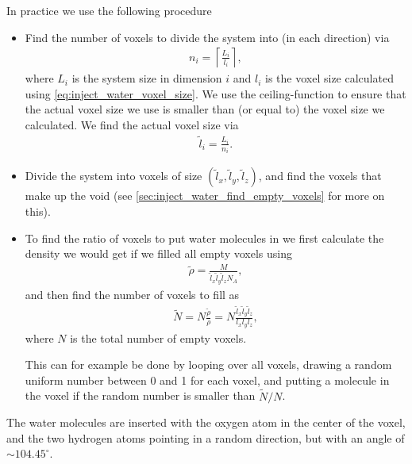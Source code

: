 In practice we use the following procedure
\begin{itemize}
    \item Find the number of voxels to divide the system into (in each direction) via
    \begin{align*}
        n_i = \left\lceil \frac{L_i}{l_i} \right\rceil,
    \end{align*}
    where $L_i$ is the system size in dimension $i$ and $l_i$ is the voxel size calculated using \cref{eq:inject_water_voxel_size}. We use the ceiling-function to ensure that the actual voxel size we use is smaller than (or equal to) the voxel size we calculated. We find the actual voxel size via
    \begin{align*}
        \tilde l_i = \frac{L_i}{n_i}.
    \end{align*}
    \item Divide the system into voxels of size $(\tilde l_x, \tilde l_y, \tilde l_z)$, and find the voxels that make up the void (see \cref{sec:inject_water_find_empty_voxels} for more on this).
    \item To find the ratio of voxels to put water molecules in we first calculate the density we would get if we filled all empty voxels using
    \begin{align*}
        \tilde\rho = \frac{M}{\tilde l_x \tilde l_y \tilde l_z N_A},
    \end{align*}
    and then find the number of voxels to fill as
    \begin{align*}
        \tilde N = N\frac{\tilde\rho}{\rho} = N\frac{\tilde l_x \tilde l_y \tilde l_z}{l_x l_y l_z},
    \end{align*}
    where $N$ is the total number of empty voxels.
    
    This can for example be done by looping over all voxels, drawing a random uniform number between 0 and 1 for each voxel, and putting a molecule in the voxel if the random number is smaller than $\tilde N / N$.
\end{itemize}
The water molecules are inserted with the oxygen atom in the center of the voxel, and the two hydrogen atoms pointing in a random direction, but with an angle of $\sim 104.45^\circ$.

